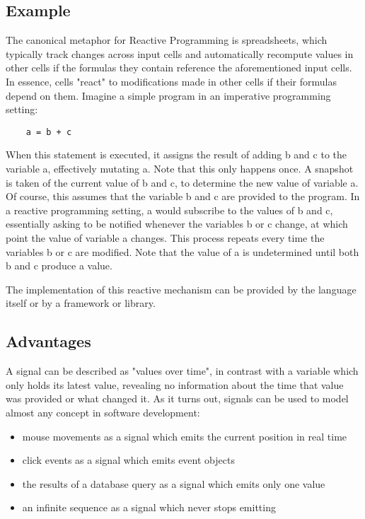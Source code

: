 \subsection{Example}

The canonical metaphor for Reactive Programming is spreadsheets, which typically track changes across input cells and automatically recompute values in other cells if the formulas they contain reference the aforementioned input cells. In essence, cells "react" to modifications made in other cells if their formulas depend on them.
Imagine a simple program in an imperative programming setting:

\begin{lstlisting}
	a = b + c
\end{lstlisting}

When this statement is executed, it assigns the result of adding b and c to the variable a, effectively mutating a. Note that this only happens once. A snapshot is taken of the current value of b and c, to determine the new value of variable a. Of course, this assumes that the variable b and c are provided to the program.
\newline
In a reactive programming setting, a would subscribe to the values of b and c, essentially asking to be notified whenever the variables b or c change, at which point the value of variable a changes. This process repeats every time the variables b or c are modified. Note that the value of a is undetermined until both b and c produce a value. 

The implementation of this reactive mechanism can be provided by the language itself or by a framework or library. 

\subsection{Advantages}

A signal can be described as "values over time", in contrast with a variable which only holds its latest value, revealing no information about the time that value was provided or what changed it. 
As it turns out, signals can be used to model almost any concept in software development:
\begin{itemize}
	\item mouse movements as a signal which emits the current position in real time
	\item click events as a signal which emits event objects
	\item the results of a database query as a signal which emits only one value
    \item an infinite sequence as a signal which never stops emitting
\end{itemize}


